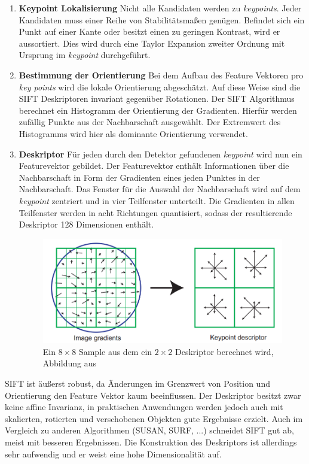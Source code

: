 \begin{enumerate}
	\item \textbf{Keypoint Lokalisierung} Nicht alle Kandidaten werden zu \textit{keypoints}. Jeder Kandidaten muss einer Reihe von Stabilitätsmaßen genügen. Befindet sich ein Punkt auf einer Kante oder besitzt einen zu geringen Kontrast, wird er aussortiert. Dies wird durch eine Taylor Expansion zweiter Ordnung mit Ursprung im \textit{keypoint} durchgeführt.
	\item \textbf{Bestimmung der Orientierung} Bei dem Aufbau des Feature Vektoren pro \textit{key points} wird die lokale Orientierung abgeschätzt. Auf diese Weise sind die SIFT Deskriptoren invariant gegenüber Rotationen. Der SIFT Algorithmus berechnet ein Histogramm der Orientierung der Gradienten. Hierfür werden zufällig Punkte aus der Nachbarschaft ausgewählt. Der Extremwert des Histogramms wird hier als dominante Orientierung verwendet.
	\item \textbf{Deskriptor} Für jeden durch den Detektor gefundenen \textit{keypoint} wird nun ein Featurevektor gebildet. Der Featurevektor enthält Informationen über die Nachbarschaft in Form der Gradienten eines jeden Punktes in der Nachbarschaft. Das Fenster für die Auswahl der Nachbarschaft wird auf dem \textit{keypoint} zentriert und in vier Teilfenster unterteilt. Die Gradienten in allen Teilfenster werden in acht Richtungen quantisiert, sodass der resultierende Deskriptor 128 Dimensionen enthält.
\begin{figure}
	\centering
	\includegraphics[scale=0.4]{images/sift_desc.png}
	\caption{Ein $8 \times 8$ Sample aus dem ein $2 \times 2$ Deskriptor berechnet wird, Abbildung aus \cite{dif2004}}
	\label{img:sift_desc}
\end{figure}	
	
\end{enumerate}

SIFT ist äußerst robust, da Änderungen im Grenzwert von Position und Orientierung den Feature Vektor kaum beeinflussen. Der Deskriptor besitzt zwar keine affine Invarianz, in praktischen Anwendungen werden jedoch auch mit skalierten, rotierten und verschobenen Objekten gute Ergebnisse erzielt. Auch im Vergleich zu anderen Algorithmen (SUSAN, SURF, ...) schneidet SIFT gut ab, meist mit besseren Ergebnissen. Die Konstruktion des Deskriptors ist allerdings sehr aufwendig und er weist eine hohe Dimensionalität auf. 

